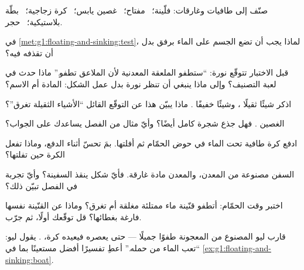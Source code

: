 \begin{exercise}[$\star$]\label{exo:g1:floating-and-sinking:1}
صنّف إلى طافيات وغارقات: فلّينة؛ \ مفتاح؛ \ غصين يابس؛ \ كرة
زجاجية؛ \ بطّة بلاستيكية؛ \ حجر.
\end{exercise}

\begin{exercise}[$\star$]\label{exo:g1:floating-and-sinking:2}
في \cref{met:g1:floating-and-sinking:test}، لماذا يجب أن تضع الجسم
على الماء برفق بدل أن تقذفه فيه؟
\end{exercise}

\begin{exercise}[$\star$]\label{exo:g1:floating-and-sinking:3}
قبل الاختبار تتوقّع نورة: ``ستطفو الملعقة المعدنية لأن الملاعق
تطفو.'' ماذا حدث في لعبة التصنيف؟ وإلى ماذا ينبغي أن تنظر نورة بدل
عمل الشكل: المادة أم الاسم؟
\end{exercise}

\begin{exercise}[$\star$]\label{exo:g1:floating-and-sinking:4}
اذكر شيئًا ثقيلًا ، وشيئًا خفيفًا . ماذا يبيّن هذا عن
التوقّع القائل ``الأشياء الثقيلة تغرق''؟
\end{exercise}

\begin{exercise}[$\star$]\label{exo:g1:floating-and-sinking:5}
الغصين . فهل  جذع شجرة كامل أيضًا؟ وأيّ مثال من الفصل
يساعدك على الجواب؟
\end{exercise}

\begin{exercise}[$\star$]\label{exo:g1:floating-and-sinking:6}
ادفع كرة طافية تحت الماء في حوض الحمّام ثم أفلتها. بمَ تحسّ أثناء
الدفع، وماذا تفعل الكرة حين تفلتها؟
\end{exercise}

\begin{exercise}[$\star$]\label{exo:g1:floating-and-sinking:7}
السفن مصنوعة من المعدن، والمعدن مادة غارقة. فأيّ شكل ينقذ
السفينة؟ وأيّ تجربة في الفصل تبيّن ذلك؟
\end{exercise}

\begin{exercise}[$\star$]\label{exo:g1:floating-and-sinking:8}
اختبر وقت الحمّام: أتطفو قنّينة ماء ممتلئة مغلقة أم تغرق؟ وماذا
عن القنّينة نفسها فارغة بغطائها؟ قل توقّعك أولًا، ثم جرّب.
\end{exercise}

\begin{exercise}[$\star\star$]\label{exo:g1:floating-and-sinking:9}
قارب ليو المصنوع من المعجونة  طفوًا جميلًا --- حتى يعصره
فيعيده كرة، . يقول ليو: ``تعب الماء من حمله.'' أعطِ تفسيرًا
أفضل مستعينًا بما في \cref{ex:g1:floating-and-sinking:boat}.
\end{exercise}
